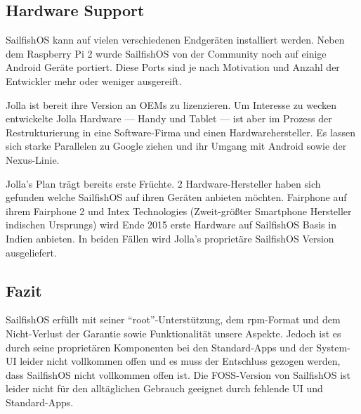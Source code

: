 \subsection{Hardware Support}
\mbox{SailfishOS} kann auf vielen verschiedenen Endgeräten installiert werden. Neben dem Raspberry Pi 2\thinspace\cite{online:sailfish-rpi2} wurde \mbox{SailfishOS} von der Community\thinspace\cite{online:sailfish-android-port} noch auf einige Android Geräte portiert. Diese Ports sind je nach Motivation und Anzahl der Entwickler mehr oder weniger ausgereift\thinspace\cite{online:sailfish-porters}.

Jolla ist bereit ihre Version an OEMs zu lizenzieren. Um Interesse zu wecken entwickelte Jolla Hardware --- Handy\thinspace\cite{online:jolla-smartphone} und Tablet\thinspace\cite{online:jolla-tablet} --- ist aber im Prozess der Restrukturierung in eine Software-Firma und einen Hardwarehersteller\thinspace\cite{online:jolla-googlelike}. Es lassen sich starke Parallelen zu Google ziehen und ihr Umgang mit Android sowie der Nexus-Linie.

Jolla's Plan trägt bereits erste Früchte. 2 Hardware-Hersteller haben sich gefunden welche \mbox{SailfishOS} auf ihren Geräten anbieten möchten. Fairphone auf ihrem Fairphone 2\thinspace\cite{online:jolla-fairphone2} und Intex Technologies (Zweit-größter Smartphone Hersteller indischen Ursprungs) wird Ende 2015 erste Hardware auf \mbox{SailfishOS} Basis in Indien anbieten\thinspace\cite{online:jolla-intex-pdf}. In beiden Fällen wird Jolla's proprietäre \mbox{SailfishOS} Version ausgeliefert.
\newline

\subsection{Fazit}
\mbox{SailfishOS} erfüllt mit seiner \mbox{``root''-Unterstützung}, dem rpm-Format und dem Nicht-Verlust der Garantie sowie Funktionalität unsere Aspekte. Jedoch ist es durch seine proprietären Komponenten bei den \mbox{Standard-Apps} und der \mbox{System-UI} leider nicht vollkommen offen und es muss der Entschluss gezogen werden, dass \mbox{SailfishOS} nicht vollkommen offen ist. Die FOSS-Version von \mbox{SailfishOS} ist leider nicht für den alltäglichen Gebrauch geeignet durch fehlende UI und Standard-Apps.